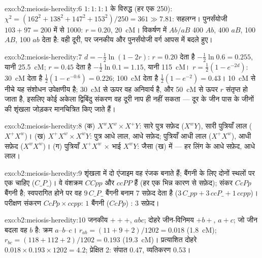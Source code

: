 \begin{solution}{exo:b2:meiosis-heredity:6}
$1 : 1 : 1 : 1$ के विरुद्ध (हर एक 250): $\chi^2 = (162^2 + 138^2 + 147^2
+ 153^2)/250 = 361 \gg 7.81$: सहलग्न। पुनर्संयोजी $103 + 97 = 200$
में से 1000: $r = 0.20$, \qty{20}{cM}। विकर्षण में $Ab/aB$ 400
$Ab$, 400 $aB$, 100 $AB$, 100 $ab$ देता है: वही दूरी, पर जनकीय
और पुनर्संयोजी वर्ग आपस में बदले हुए।
\end{solution}

\begin{solution}{exo:b2:meiosis-heredity:7}
$d = -\tfrac12\ln(1 - 2r)$: $r = 0.20$ देता है $-\tfrac12\ln 0.6 =
0.255$, यानी \qty{25.5}{cM}; $r = 0.45$ देता है $-\tfrac12\ln 0.1 = 1.15$,
यानी \qty{115}{cM}। $r = \tfrac12(1 - e^{-2d})$: \qty{30}{cM} देता है
$\tfrac12(1 - e^{-0.6}) = 0.226$; \qty{100}{cM} देता है $\tfrac12(1 -
e^{-2}) = 0.43$। \qty{10}{cM} से नीचे यह संशोधन उपेक्षणीय है;
\qty{30}{cM} से ऊपर वह अनिवार्य है, और \qty{50}{cM} से ऊपर $r$
संतृप्त हो जाता है, इसलिए कोई अकेला द्विबिंदु संकरण वह दूरी नाप ही नहीं
सकता --- दूर के जीन पास के जीनों की शृंखला जोड़कर मानचित्रित किए जाते हैं।
\end{solution}

\begin{solution}{exo:b2:meiosis-heredity:8}
(क) $X^wX^w \times X^+Y$: सारे पुत्र सफ़ेद ($X^wY$), सारी पुत्रियाँ लाल
($X^+X^w$)। (ख) $X^+X^w \times X^wY$: पुत्र आधे लाल, आधे सफ़ेद;
पुत्रियाँ आधी लाल ($X^+X^w$), आधी सफ़ेद ($X^wX^w$)। (ग) पुत्रियाँ
$X^+X^w$ $\times$ भाई $X^wY$: जैसा (ख) में --- हर लिंग के आधे
सफ़ेद, आधे लाल।
\end{solution}

\begin{solution}{exo:b2:meiosis-heredity:9}
शृंखला में दो एंजाइम वह रंजक बनाते हैं; बैंगनी के लिए दोनों स्थलों पर एक
  चाहिए ($C\_P\_$)। वे वंशक्रम $CCpp$ और $ccPP$ हैं
(हर एक भिन्न कारण से सफ़ेद); संकर $CcPp$ बैंगनी है;
स्वपरागित होने पर वह $9\,C\_P\_$ बैंगनी बनाम $7$ सफ़ेद देता है ($3\,C\_pp + 3\,ccP\_ +
1\,ccpp$)। परीक्षण संकरण $CcPp\times ccpp$: $1$ बैंगनी ($CcPp$) : $3$
सफ़ेद।
\end{solution}

\begin{solution}{exo:b2:meiosis-heredity:10}
जनकीय $+++$, $abc$; दोहरे जीन-विनिमय $+b+$, $a+c$; जो जीन बदला वह $b$
है: क्रम $a$--$b$--$c$। $r_{ab} = (11 + 9 + 2)/1202
= 0.018$ (\qty{1.8}{cM}); $r_{bc} = (118 + 112 + 2)/1202 = 0.193$
(\qty{19.3}{cM})। प्रत्याशित दोहरे $0.018\times 0.193\times 1202 =
4.2$; प्रेक्षित 2: संपात $0.47$, व्यतिकरण $0.53$।
\end{solution}

